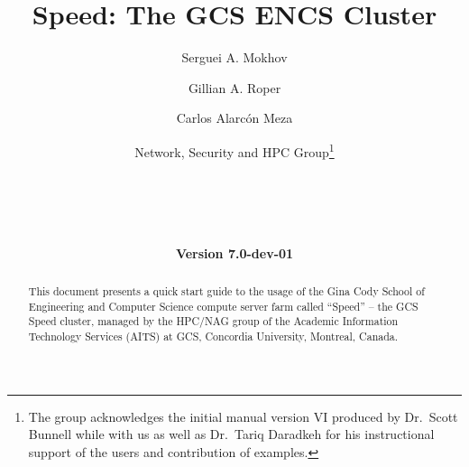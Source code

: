 \documentclass{easychair}
\begin{document}
%
\title{Speed: The GCS ENCS Cluster}

%

\date{\textbf{Version 7.0-dev-01}}

%
\author{
    Serguei A. Mokhov
\and
    Gillian A. Roper
\and
    Carlos Alarcón Meza
\and
    Network, Security and HPC Group\footnote{The group acknowledges the initial manual version VI produced by Dr.~Scott Bunnell while with us
		as well as Dr.~Tariq Daradkeh for his instructional support of the users and contribution of examples.}\\
    \\
    \\
    \\
    \\
}

%

\maketitle

\begin{abstract}
This document presents a quick start guide to the usage of the Gina Cody School 
of Engineering and Computer Science compute server farm called ``Speed'' -- the 
GCS Speed cluster, managed by the HPC/NAG group of the Academic Information 
Technology Services (AITS) at GCS, Concordia University, Montreal, Canada.
\end{abstract}
\end{document}
